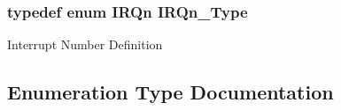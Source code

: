\subsubsection[{I\+R\+Qn\+\_\+\+Type}]{\setlength{\rightskip}{0pt plus 5cm}typedef enum {\bf I\+R\+Qn}  {\bf I\+R\+Qn\+\_\+\+Type}}\label{group___s_a_m_l21_j18_a__cmsis_gac3af4a32370fb28c4ade8bf2add80251}
Interrupt Number Definition 

\subsection{Enumeration Type Documentation}
\hypertarget{group___s_a_m_l21_j18_a__cmsis_ga666eb0caeb12ec0e281415592ae89083}{}
